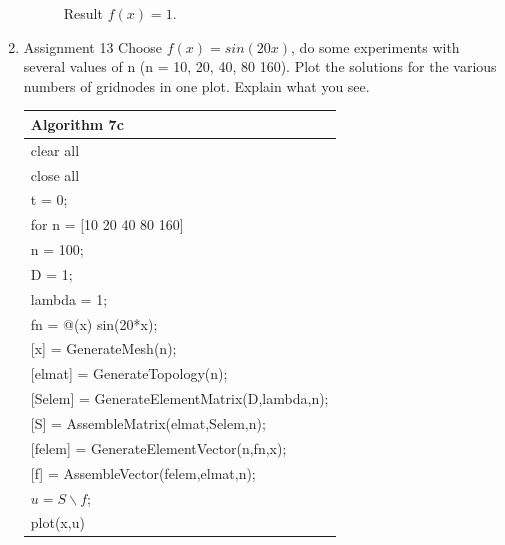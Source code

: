 \documentclass[a4paper,10pt]{report}
\begin{document}
\begin{enumerate}
\begin{figure}
\caption{ Result $f (x) = 1$.}\label{fig:hep_2}
\vspace{-10pt}
\end{figure} 



\item{Assignment 13} Choose $f (x) = sin(20x)$, do some experiments with several
values of n (n = 10, 20, 40, 80 160). Plot the solutions for the various
numbers of gridnodes in one plot. Explain what you see.
\begin{table}
\begin{tabular}{ |l| } 
\hline
\textbf{Algorithm 7c}\\
\hline
\hspace{0.5cm}clear all\\
\hspace{0.5cm}close all\\
\hspace{0.5cm}t = 0;\\
\hspace{0.5cm}for n = [10 20 40 80 160]\\
\hspace{1cm}n = 100;\\
\hspace{1cm}D = 1;\\
\hspace{1cm}lambda = 1;\\
\hspace{1cm}fn = @(x) sin(20*x);\\
\hspace{1cm}[x] = GenerateMesh(n);\\
\hspace{01cm}[elmat] = GenerateTopology(n);\\
\hspace{1cm}[Selem] = GenerateElementMatrix(D,lambda,n);\\
\hspace{1cm}[S] = AssembleMatrix(elmat,Selem,n);\\
\hspace{1cm}[felem] = GenerateElementVector(n,fn,x);\\
\hspace{1cm}[f] = AssembleVector(felem,elmat,n);\\
\hspace{1cm} $u = S\backslash f$;\\
\hspace{1cm}plot(x,u)\\

\end{tabular}
\end{table}
\end{enumerate}
\end{document}
